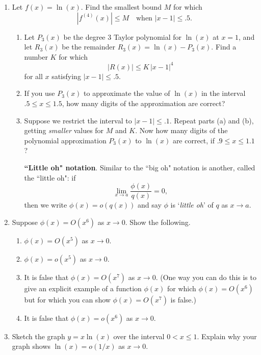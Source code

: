 \begin{enumerate}
\begin{enumerate}
  \item $\sqrt{1 + x^2} = O(x)$.

  \item $\sqrt{1 + x^p} = O(x^{p/2})$.


\end{enumerate}
\item Let $f(x) = \ln(x)$.  Find the smallest bound $M$ for which
        \[
|f^{(4)}(x)| \leq M \quad \mbox{when $|x - 1| \leq .5$}.
\]


  \begin{enumerate}
  \item Let $P_3(x)$ be the degree 3 Taylor polynomial for $\ln(x)$ at $x
= 1$, and let $R_3(x)$ be the remainder $R_3(x) = \ln(x) - P_3(x)$.
Find a number $K$ for which
        \[
|R(x)| \leq K \, |x - 1|^4
\]
for all $x$ satisfying $|x - 1| \leq .5$.

  \item If you use $P_3(x)$ to approximate the value of $\ln(x)$ in the
interval $.5 \leq x \leq 1.5$, how many digits of the approximation
are correct?

  \item Suppose we restrict the interval to $|x - 1| \leq .1$.  Repeat
parts (a) and (b), getting {\em smaller\/} values for $M$ and $K$.
Now how many digits of the polynomial approximation $P_3(x)$ to
$\ln(x)$ are correct, if $.9 \leq x \leq 1.1$?




{\bf ``Little oh" notation}.  Similar to the ``big oh" notation is
another, called the ``little oh": if
\[
\lim_{x \rightarrow a} \dfrac{\phi(x)}{q(x)} = 0,
\]
then we write $\phi(x) = o(q(x))$ and say $\phi$ is `{\em little oh}'
of $q$ as $x \rightarrow a$.


\end{enumerate}
\item Suppose $\phi(x) = O(x^6)$ as $x \rightarrow 0$.  Show the following.

  \begin{enumerate}
  \item $\phi(x) = O(x^5)$ as $x \rightarrow 0$.

  \item $\phi(x) = o(x^5)$ as $x \rightarrow 0$.

  \item It is false that $\phi(x) = O(x^7)$ as $x \rightarrow 0$.  (One
way you can do this is to give an explicit example of a function
$\phi(x)$ for which $\phi(x) = O(x^6)$ but for which you can show
$\phi(x) = O(x^7)$ is false.)


  \item It is false that $\phi(x) = o(x^6)$ as $x \rightarrow 0$.


\end{enumerate}
\item Sketch the graph $y = x \ln(x)$ over the interval $0 < x \leq 1$.
Explain why your graph shows $\ln(x) = o(1/x)$ as $x \rightarrow 0$.




\end{enumerate}
